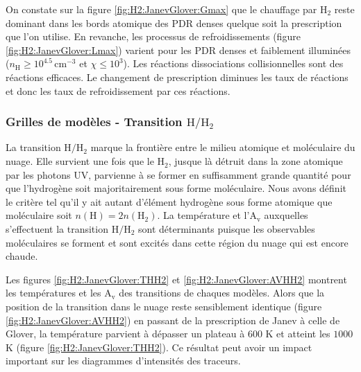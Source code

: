 On constate sur la figure \ref{fig:H2:JanevGlover:Gmax} que le chauffage par $\mathrm{H}_2$ reste dominant dans les bords atomique des PDR denses quelque soit la prescription que l'on utilise. En revanche, les processus de refroidissements (figure \ref{fig:H2:JanevGlover:Lmax}) varient pour les PDR denses et faiblement illuminées ($n_\mathrm{H} \geq 10^{4.5} \, \mathrm{cm}^{-3}$ et $\chi \leq 10^3$). Les réactions dissociations collisionnelles sont des réactions efficaces. Le changement de prescription diminues les taux de réactions et donc les taux de refroidissement par ces réactions. 


\subsubsection{Grilles de modèles - Transition $\mathrm{H}/\mathrm{H}_2$}

La transition $\mathrm{H}/\mathrm{H}_2$ marque la frontière entre le milieu atomique et moléculaire du nuage. Elle survient une fois que le $\mathrm{H}_2$, jusque là détruit dans la zone atomique par les photons UV, parvienne à se former en suffisamment grande quantité pour que l'hydrogène soit majoritairement sous forme moléculaire. Nous avons définit le critère tel qu'il y ait autant d'élément hydrogène sous forme atomique que moléculaire soit $n(\mathrm{H}) = 2 n(\mathrm{H}_2)$. La température et l'$\mathrm{A}_\mathrm{v}$ auxquelles s'effectuent la transition $\mathrm{H}/\mathrm{H}_2$ sont déterminants puisque les observables moléculaires se forment et sont excités dans cette région du nuage qui est encore chaude. \newline

Les figures \ref{fig:H2:JanevGlover:THH2} et \ref{fig:H2:JanevGlover:AVHH2} montrent les températures et les $\mathrm{A}_\mathrm{v}$ des transitions de chaques modèles. Alors que la position de la transition dans le nuage reste sensiblement identique (figure \ref{fig:H2:JanevGlover:AVHH2}) en passant de la prescription de Janev à celle de Glover, la température parvient à dépasser un plateau à $600$ K et atteint les $1000$ K (figure \ref{fig:H2:JanevGlover:THH2}). Ce résultat peut avoir un impact important sur les diagrammes d'intensités des traceurs. 


